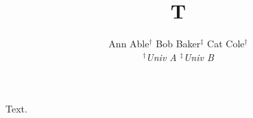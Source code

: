 \documentclass{article}
\title{T}
\author{Ann Able$^{\dagger}$ \quad Bob Baker$^{\ddagger}$ \quad Cat Cole$^{\dagger}$ \\ \textit{$^{\dagger}$Univ A \qquad $^{\ddagger}$Univ B}}
\begin{document}
\maketitle
Text.
\end{document}
